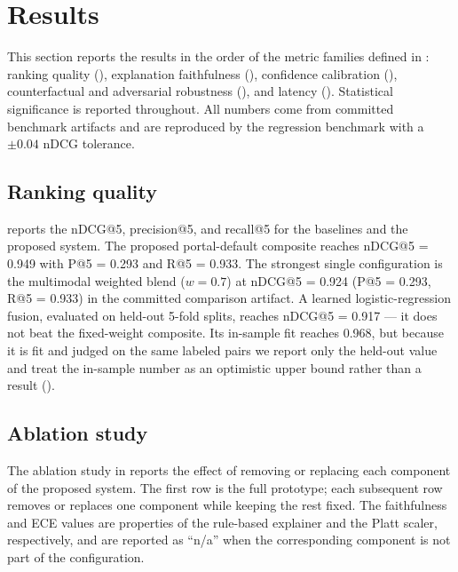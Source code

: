 \section{Results}\label{sec:5}

This section reports the results in the order of the metric families defined in : ranking quality (), explanation faithfulness (), confidence calibration (), counterfactual and adversarial robustness (), and latency ().
Statistical significance is reported throughout.
All numbers come from committed benchmark artifacts and are reproduced by the regression benchmark with a $\pm 0.04$ nDCG tolerance.

\subsection{Ranking quality}\label{sec:5.1}
 reports the nDCG@5, precision@5, and recall@5 for the baselines and the proposed system.
The proposed portal-default composite reaches nDCG@5 = 0.949 with P@5 = 0.293 and R@5 = 0.933.
The strongest single configuration is the multimodal weighted blend ($w = 0.7$) at nDCG@5 = 0.924 (P@5 = 0.293, R@5 = 0.933) in the committed comparison artifact.
A learned logistic-regression fusion, evaluated on held-out 5-fold splits, reaches nDCG@5 = 0.917 --- it does not beat the fixed-weight composite. Its in-sample fit reaches 0.968, but because it is fit and judged on the same labeled pairs we report only the held-out value and treat the in-sample number as an optimistic upper bound rather than a result ().



\subsection{Ablation study}
The ablation study in  reports the effect of removing or replacing each component of the proposed system.
The first row is the full prototype; each subsequent row removes or replaces one component while keeping the rest fixed.
The faithfulness and ECE values are properties of the rule-based explainer and the Platt scaler, respectively, and are reported as ``n/a'' when the corresponding component is not part of the configuration.

